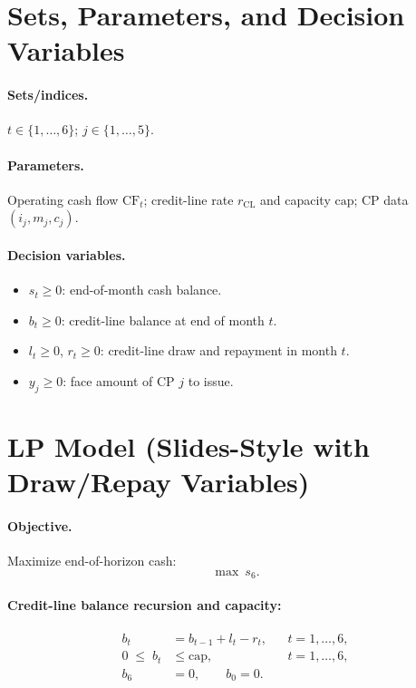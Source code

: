 \documentclass[11pt]{article}
\begin{document}
\section*{Sets, Parameters, and Decision Variables}

\paragraph{Sets/indices.} $t \in \{1,\ldots,6\}$; $j \in \{1,\ldots,5\}$.

\paragraph{Parameters.} Operating cash flow $\mathrm{CF}_t$; credit-line rate $r_{\mathrm{CL}}$ and capacity $\mathrm{cap}$; CP data $(i_j,m_j,c_j)$.

\paragraph{Decision variables.}
\begin{itemize}
\item $s_t \ge 0$: end-of-month cash balance.
\item $b_t \ge 0$: credit-line balance at end of month $t$.
\item $l_t \ge 0$, $r_t \ge 0$: credit-line draw and repayment in month $t$.
\item $y_j \ge 0$: face amount of CP $j$ to issue.
\end{itemize}

\section*{LP Model (Slides-Style with Draw/Repay Variables)}

\paragraph{Objective.} Maximize end-of-horizon cash:
\begin{equation}
\max \ s_6.
\end{equation}

\paragraph{Credit-line balance recursion and capacity:}
\begin{align}
b_t &= b_{t-1} + l_t - r_t, && t=1,\dots,6, \label{eq:balrec}\\
0 \;\le\; b_t &\le \mathrm{cap}, && t=1,\dots,6, \label{eq:cap}\\
b_6 &= 0, \qquad b_0=0. \label{eq:terminal}
\end{align}
\end{document}
